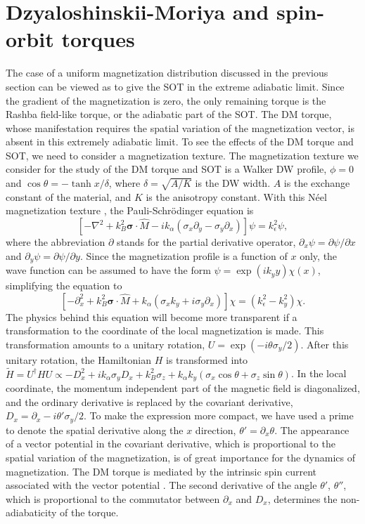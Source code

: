 \documentclass[12pt]{iopart}
\begin{document}
\section{Dzyaloshinskii-Moriya and spin-orbit torques}
\label{dw}
The case of a uniform magnetization distribution discussed in the previous section can be viewed as to give the SOT in the extreme adiabatic limit. Since the gradient of the magnetization is zero, the only remaining torque is the Rashba field-like torque, or the adiabatic part of the SOT. The DM torque, whose manifestation requires the spatial variation of the magnetization vector, is absent in this extremely adiabatic limit. To see the effects of the DM torque and SOT, we need to consider a magnetization texture. The magnetization texture we consider for the study of the DM torque and SOT is a Walker DW profile, $\phi = 0$ and $\cos \theta = -\tanh {x/\delta}$, where $\delta = \sqrt{A/K}$ is the DW width. $A$ is the exchange constant of the material, and $K$ is the anisotropy constant. With this N\'{e}el magnetization texture \cite{HB}, the Pauli-Schr\"{o}dinger equation is
\begin{equation}
\left[ - \nabla ^2 + k_B^2 \bm {\sigma } \cdot \hat {M} - i k_ \alpha (\sigma_x \partial_y - \sigma_y \partial_x) \right] \psi = k_ \epsilon ^2 \psi,
\end{equation}
where the abbreviation $\partial$ stands for the partial derivative operator, $\partial_x \psi = \partial \psi/\partial x$ and $\partial_y \psi = \partial \psi/\partial y$. Since the magnetization profile is a function of $x$ only, the wave function can be assumed to have the form $\psi = \exp (i k_y y)  \chi (x)$, simplifying the equation to
\begin{equation}
\left[ - \partial_x ^2 + k_B^2 \bm {\sigma } \cdot \hat {M} +  k_ \alpha (\sigma_x k_y + i \sigma_y \partial_x) \right] \chi = \left( k_ \epsilon ^2 - k_ y ^2 \right) \chi.
\label{eq_chi}
\end{equation}
The physics behind this equation will become more transparent if a transformation to the coordinate of the local magnetization is made. This transformation amounts to a unitary rotation, $U = \exp (-i \theta \sigma_y/2)$. After this unitary rotation, the Hamiltonian $H$ is transformed into $\tilde {H} = U^\dagger H U \propto - D_x ^2 + i k_ \alpha \sigma_y D_x + k_B^2 \sigma_z +  k_ \alpha k_y (\sigma_x \cos \theta + \sigma_z \sin \theta)$. In the local coordinate, the momentum independent part of the magnetic field is diagonalized, and the ordinary derivative is replaced by the covariant derivative, $D_x = \partial_x - i \theta' \sigma_y/2$. To make the expression more compact, we have used a prime to denote the spatial derivative along the $x$ direction, $\theta' = \partial_x \theta$. The appearance of a vector potential in the covariant derivative, which is proportional to the spatial variation of the magnetization, is of great importance for the dynamics of magnetization. The DM torque is mediated by the intrinsic spin current associated with the vector potential \cite{Kikuchi16}. The second derivative of the angle $\theta'$, $\theta''$, which is proportional to the commutator between $\partial_x$ and $D_x$, determines the non-adiabaticity of the torque.
\end{document}
